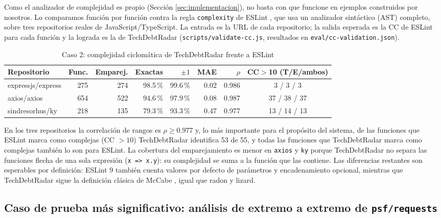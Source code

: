 Como el analizador de complejidad es propio (Sección \ref{sec:implementacion}), no basta con que funcione en ejemplos construidos por nosotros. Lo comparamos función por función contra la regla \texttt{complexity} de ESLint \parencite{ESLintComplexity}, que usa un analizador sintáctico (AST) completo, sobre tres repositorios reales de JavaScript/TypeScript. La entrada es la URL de cada repositorio; la salida esperada es la CC de ESLint para cada función y la lograda es la de TechDebtRadar (\texttt{scripts/validate-cc.js}, resultados en \texttt{eval/cc-validation.json}).

\begin{table}[H]
\centering
\caption{Caso 2: complejidad ciclomática de TechDebtRadar frente a ESLint}
\label{tab:validacion-cc}
\small
\begin{tabular}{p{} r r r r r r c}
\toprule
\textbf{Repositorio} & \textbf{Func.} & \textbf{Emparej.} & \textbf{Exactas} & \textbf{$\pm 1$} & \textbf{MAE} & \textbf{$\rho$} & \textbf{CC$>$10 (T/E/ambos)} \\
\midrule
expressjs/express & 275 & 274 & 98.5\,\% & 99.6\,\% & 0.02 & 0.986 & 3 / 3 / 3 \\
axios/axios & 654 & 522 & 94.6\,\% & 97.9\,\% & 0.08 & 0.987 & 37 / 38 / 37 \\
sindresorhus/ky & 218 & 135 & 79.3\,\% & 93.3\,\% & 0.47 & 0.977 & 13 / 14 / 13 \\
\bottomrule
\end{tabular}
\end{table}

En los tres repositorios la correlación de rangos es $\rho \geq 0.977$ y, lo más importante para el propósito del sistema, de las funciones que ESLint marca como complejas (CC $> 10$) TechDebtRadar identifica 53 de 55, y todas las funciones que TechDebtRadar marca como complejas también lo son para ESLint. La cobertura del emparejamiento es menor en \texttt{axios} y \texttt{ky} porque TechDebtRadar no separa las funciones flecha de una sola expresión (\texttt{x => x.y}): su complejidad se suma a la función que las contiene. Las diferencias restantes son esperables por definición: ESLint 9 también cuenta valores por defecto de parámetros y encadenamiento opcional, mientras que TechDebtRadar sigue la definición clásica de McCabe \parencite{McCabe1976}, igual que radon y lizard.

\subsection{Caso de prueba más significativo: análisis de extremo a extremo de \texttt{psf/requests}}

